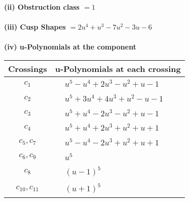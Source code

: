 \documentclass[1p]{elsarticle_modified}
\theoremstyle{definition}
\begin{document}
\flushleft \textbf{(ii) Obstruction class $= 1$}\\~\\
\flushleft \textbf{(iii) Cusp Shapes $= 2 u^4+u^3-7 u^2-3 u-6$}\\~\\
\newpage\renewcommand{\arraystretch}{1}
\flushleft \textbf{(iv) u-Polynomials at the component}\newline \\
\begin{tabular}{m{50pt}|m{274pt}}
Crossings & \hspace{64pt}u-Polynomials at each crossing \\
\hline $$\begin{aligned}c_{1}\end{aligned}$$&$\begin{aligned}
&u^5- u^4+2 u^3- u^2+u-1
\end{aligned}$\\
\hline $$\begin{aligned}c_{2}\end{aligned}$$&$\begin{aligned}
&u^5+3 u^4+4 u^3+u^2- u-1
\end{aligned}$\\
\hline $$\begin{aligned}c_{3}\end{aligned}$$&$\begin{aligned}
&u^5+u^4-2 u^3- u^2+u-1
\end{aligned}$\\
\hline $$\begin{aligned}c_{4}\end{aligned}$$&$\begin{aligned}
&u^5+u^4+2 u^3+u^2+u+1
\end{aligned}$\\
\hline $$\begin{aligned}c_{5},c_{7}\end{aligned}$$&$\begin{aligned}
&u^5- u^4-2 u^3+u^2+u+1
\end{aligned}$\\
\hline $$\begin{aligned}c_{6},c_{9}\end{aligned}$$&$\begin{aligned}
&u^5
\end{aligned}$\\
\hline $$\begin{aligned}c_{8}\end{aligned}$$&$\begin{aligned}
&(u-1)^5
\end{aligned}$\\
\hline $$\begin{aligned}c_{10},c_{11}\end{aligned}$$&$\begin{aligned}
&(u+1)^5
\end{aligned}$\\
\hline
\end{tabular}\\~\\
\end{document}
